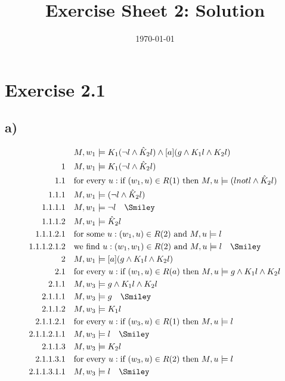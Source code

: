 \documentclass[a4paper]{article}
\begin{document}
\title{Exercise Sheet 2: Solution}
\author{}
\date{\today}
\section{Exercise 2.1}
\subsection{a)}
\begin{align*}
& M, w_1 \models K_1(\lnot l \land \hat K_2 l) \land [a] (g \land K_1 l \land K_2 l)\\
\text{1}\quad & M, w_1 \models K_1(\lnot l \land \hat K_2 l)\\
\text{1.1}\quad & \text{for every } u: \text{if }(w_1, u) \in R(1) \text{ then } M, u \models (lnot l \land \hat K_2 l)\\
\text{1.1.1}\quad & M, w_1 \models (\lnot l \land \hat K_2 l)\\
\text{1.1.1.1}\quad & M, w_1 \models \lnot l \quad\text{\Smiley}\\
\text{1.1.1.2}\quad & M, w_1 \models \hat K_2 l\\
\text{1.1.1.2.1}\quad & \text{for some } u: (w_1, u) \in R(2) \text{ and } M, u \models l\\
\text{1.1.1.2.1.2}\quad & \text{we find } u: (w_1, w_1) \in R(2) \text{ and } M, u \models l \quad\text{\Smiley}\\
\text{2}\quad & M, w_1 \models [a] (g \land K_1 l \land K_2 l)\\
\text{2.1}\quad & \text{for every } u: \text{if }(w_1, u) \in R(a) \text{ then } M, u \models g \land K_1 l \land K_2 l\\
\text{2.1.1}\quad & M, w_3 \models g \land K_1 l \land K_2 l\\
\text{2.1.1.1}\quad & M, w_3 \models g \quad\text{\Smiley}\\
\text{2.1.1.2}\quad & M, w_3 \models K_1 l\\
\text{2.1.1.2.1}\quad & \text{for every } u: \text{if }(w_3, u) \in R(1) \text{ then } M, u \models l\\
\text{2.1.1.2.1.1}\quad & M, w_3 \models l \quad\text{\Smiley}\\
\text{2.1.1.3}\quad & M, w_3 \models K_2 l\\
\text{2.1.1.3.1}\quad & \text{for every } u: \text{if }(w_3, u) \in R(2) \text{ then } M, u \models l\\
\text{2.1.1.3.1.1}\quad & M, w_3 \models l \quad\text{\Smiley}\\
\end{align*}
\end{document}
